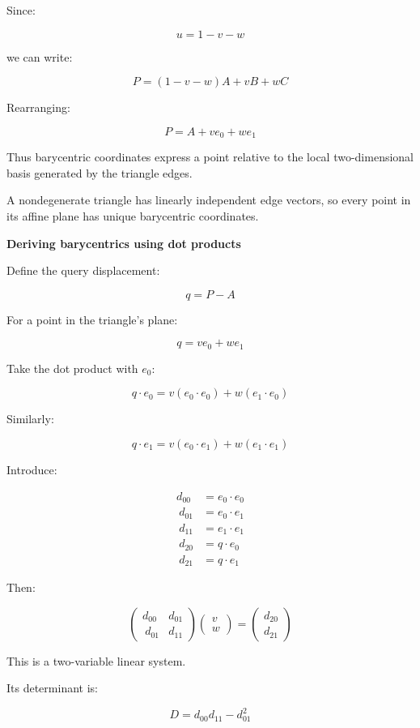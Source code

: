 Since:

\[
u=1-v-w
\]

we can write:

\[
P=(1-v-w)A+vB+wC
\]

Rearranging:

\[
\boxed{P=A+ve_0+we_1}
\]

Thus barycentric coordinates express a point relative to the local two-dimensional basis generated by the triangle edges.

A nondegenerate triangle has linearly independent edge vectors, so every point in its affine plane has unique barycentric coordinates.

\textbf{Deriving barycentrics using dot products}

Define the query displacement:

\[
q=P-A
\]

For a point in the triangle's plane:

\[
q=ve_0+we_1
\]

Take the dot product with \(e_0\):

\[
q\cdot e_0 = v(e_0\cdot e_0)+w(e_1\cdot e_0)
\]

Similarly:

\[
q\cdot e_1 = v(e_0\cdot e_1)+w(e_1\cdot e_1)
\]

Introduce:

\[
\begin{aligned} d_{00}&=e_0\cdot e_0\\\ d_{01}&=e_0\cdot e_1\\\ d_{11}&=e_1\cdot e_1\\\ d_{20}&=q\cdot e_0\\\ d_{21}&=q\cdot e_1 \end{aligned}
\]

Then:

\[
\begin{pmatrix} d_{00}&d_{01}\\\ d_{01}&d_{11} \end{pmatrix} \begin{pmatrix}v\\w\end{pmatrix} = \begin{pmatrix}d_{20}\\d_{21}\end{pmatrix}
\]

This is a two-variable linear system.

Its determinant is:

\[
D=d_{00}d_{11}-d_{01}^2
\]

